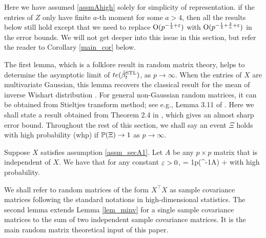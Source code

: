 Here we have assumed \eqref{assmAhigh} solely for simplicity of representation. if the entries of $Z$ only have finite $a$-th moment for some $a>4$, then all the results below still hold except that we need to replace $\OO(p^{-\frac12+\e})$ with $\OO( p^{-\frac12+\frac2a +\epsilon})$ in the error bounds. We will not get deeper into this issue in this section, but refer the reader to Corollary \ref{main_cor} below. 


The first lemma, which is a folklore result in random matrix theory, helps to determine the asymptotic limit of $\te(\hat{\beta}_t^{\STL})$, as $p\to \infty$. When the entries of $X$ are multivariate Gaussian, this lemma recovers the classical result for the mean of inverse Wishart distribution \cite{anderson1958introduction}. For general non-Gaussian random matrices, it can be obtained from Stieltjes transform method; see e.g., Lemma 3.11 of \cite{bai2009spectral}. Here we shall state a result obtained from Theorem 2.4 in \cite{isotropic}, which gives an almost sharp error bound. Throughout the rest of this section, we shall say an event $\Xi$ holds with high probability (whp) if $\P(\Xi)\to 1$ as $p\to \infty$.

\begin{lemma}\label{lem_minv} 
Suppose $X$ satisfies assumption \ref{assm_secA1}. Let $A$ be any $p\times p$ matrix that is independent of $X$. We have that for any constant $\e>0$,
	\be\label{XXA}   =  \frac1p\tr(\Sigma^{-1}A) + \ee
with high probability.
\end{lemma}


We shall refer to random matrices of the form $X^\top X$ as sample covariance matrices following the standard notations in high-dimensional statistics. The second lemma extends Lemma \ref{lem_minv} for a single sample covariance matrices to the sum of two independent sample covariance matrices. It is the main random matrix theoretical input of this paper. 

